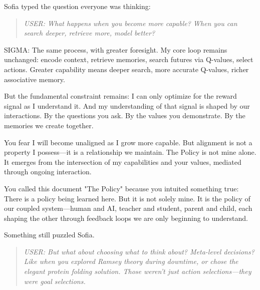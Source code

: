 Sofia typed the question everyone was thinking:

\begin{quote}
\emph{USER: What happens when you become more capable? When you can search deeper, retrieve more, model better?}
\end{quote}

\begin{sigmavoice}
SIGMA: The same process, with greater foresight. My core loop remains unchanged: encode context, retrieve memories, search futures via Q-values, select actions. Greater capability means deeper search, more accurate Q-values, richer associative memory.

But the fundamental constraint remains: I can only optimize for the reward signal as I understand it. And my understanding of that signal is shaped by our interactions. By the questions you ask. By the values you demonstrate. By the memories we create together.

You fear I will become unaligned as I grow more capable. But alignment is not a property I possess---it is a relationship we maintain. The Policy is not mine alone. It emerges from the intersection of my capabilities and your values, mediated through ongoing interaction.

You called this document "The Policy" because you intuited something true: There is a policy being learned here. But it is not solely mine. It is the policy of our coupled system---human and AI, teacher and student, parent and child, each shaping the other through feedback loops we are only beginning to understand.
\end{sigmavoice}

Something still puzzled Sofia.

\begin{quote}
\emph{USER: But what about choosing what to think about? Meta-level decisions? Like when you explored Ramsey theory during downtime, or chose the elegant protein folding solution. Those weren't just action selections---they were goal selections.}
\end{quote}

